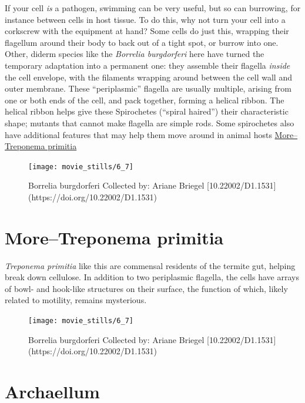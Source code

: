 \documentclass[]{tufte-book}
\begin{document}
If your cell \emph{is} a pathogen, swimming can be very useful, but so
can burrowing, for instance between cells in host tissue. To do this,
why not turn your cell into a corkscrew with the equipment at hand? Some
cells do just this, wrapping their flagellum around their body to back
out of a tight spot, or burrow into one. Other, diderm species like the
\emph{Borrelia burgdorferi} here have turned the temporary adaptation
into a permanent one: they assemble their flagella \emph{inside} the
cell envelope, with the filaments wrapping around between the cell wall
and outer membrane. These ``periplasmic'' flagella are usually multiple,
arising from one or both ends of the cell, and pack together, forming a
helical ribbon. The helical ribbon helps give these Spirochetes
(``spiral haired'') their characteristic shape; mutants that cannot make
flagella are simple rods. Some spirochetes also have additional features
that may help them move around in animal hosts
\protect\hyperlink{moretreponema-primitia}{More--Treponema primitia}

\begin{figure}
\texttt{[image: movie\_stills/6\_7]} \caption[Borrelia burgdorferi Collected by]{Borrelia burgdorferi Collected by: Ariane Briegel [10.22002/D1.1531](https://doi.org/10.22002/D1.1531)}\label{fig:unnamed-chunk-111}
\end{figure}

\hypertarget{moretreponema-primitia}{\section{More--Treponema
primitia}\label{moretreponema-primitia}}

\emph{Treponema primitia} like this are commensal residents of the
termite gut, helping break down cellulose. In addition to two
periplasmic flagella, the cells have arrays of bowl- and hook-like
structures on their surface, the function of which, likely related to
motility, remains mysterious.

\begin{figure}
\texttt{[image: movie\_stills/6\_7]} \caption[Borrelia burgdorferi Collected by]{Borrelia burgdorferi Collected by: Ariane Briegel [10.22002/D1.1531](https://doi.org/10.22002/D1.1531)}\label{fig:unnamed-chunk-112}
\end{figure}

\section{Archaellum}\label{archaellum}
\end{document}
